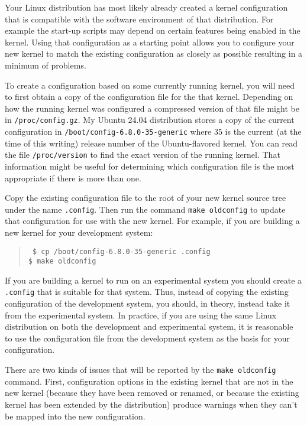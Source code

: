 \documentclass{article}
\newcommand{\command}[1]{\texttt{#1}}
\newcommand{\filename}[1]{\texttt{#1}}
\newenvironment{commands}
  {\begin{quote} \tt}
  {\end{quote}}
\begin{document}
Your Linux distribution has most likely already created a kernel configuration that is
compatible with the software environment of that distribution. For example the start-up scripts
may depend on certain features being enabled in the kernel. Using that configuration as a
starting point allows you to configure your new kernel to match the existing configuration as
closely as possible resulting in a minimum of problems.

To create a configuration based on some currently running kernel, you will need to first obtain
a copy of the configuration file for the that kernel. Depending on how the running kernel was
configured a compressed version of that file might be in \filename{/proc/config.gz}. My Ubuntu
24.04 distribution stores a copy of the current configuration in
\filename{/boot/config-6.8.0-35-generic} where 35 is the current (at the time of this writing)
release number of the Ubuntu-flavored kernel. You can read the file \filename{/proc/version} to
find the exact version of the running kernel. That information might be useful for determining
which configuration file is the most appropriate if there is more than one.

Copy the existing configuration file to the root of your new kernel source tree under the name
\filename{.config}. Then run the command \command{make oldconfig} to update that configuration
for use with the new kernel. For example, if you are building a new kernel for your development
system:
\begin{commands}
  \$ cp /boot/config-6.8.0-35-generic .config \\
  \$ make oldconfig
\end{commands}

If you are building a kernel to run on an experimental system you should create a
\filename{.config} that is suitable for that system. Thus, instead of copying the existing
configuration of the development system, you should, in theory, instead take it from the
experimental system. In practice, if you are using the same Linux distribution on both the
development and experimental system, it is reasonable to use the configuration file from the
development system as the basis for your configuration.

There are two kinds of issues that will be reported by the \command{make oldconfig} command.
First, configuration options in the existing kernel that are not in the new kernel (because they
have been removed or renamed, or because the existing kernel has been extended by the
distribution) produce warnings when they can't be mapped into the new configuration.
\end{document}
